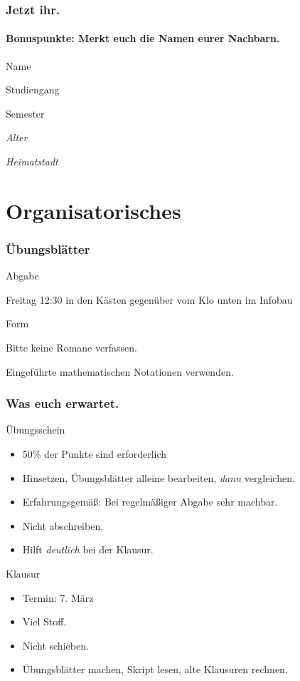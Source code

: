 \documentclass{beamer}
\begin{document}
\begin{frame}
  \frametitle{Jetzt ihr.}
  \framesubtitle{Bonuspunkte: Merkt euch die Namen eurer Nachbarn.}
  \begin{description}
    \item Name
    \item Studiengang
    \item Semester
    \item {\small \textit{Alter}}
    \item {\small \textit{Heimatstadt}}
  \end{description}
\end{frame}

\section{Organisatorisches}
\begin{frame}
  \frametitle{Übungsblätter}
  \begin{block}{Abgabe}
    \begin{description}
      \item{\LARGE Freitag 12:30} in den Kästen gegenüber vom Klo unten im Infobau
    \end{description}
  \end{block}
  \begin{block}{Form}
    \begin{description}
      \item Bitte {\LARGE keine} Romane verfassen.
      \item Eingeführte mathematischen Notationen verwenden.
    \end{description}
  \end{block}
\end{frame}

\begin{frame}
  \frametitle{Was euch erwartet.}
  \begin{block}{Übungsschein}
    \begin{itemize}
      \item 50\% der Punkte sind erforderlich
      \item Hinsetzen, Übungsblätter alleine bearbeiten, \emph{dann} vergleichen.
      \item Erfahrungsgemäß: Bei regelmäßiger Abgabe sehr machbar.
      \item Nicht abschreiben.
      \item Hilft \emph{deutlich} bei der Klausur.
    \end{itemize}
  \end{block}
  \begin{block}{Klausur}
    \begin{itemize}
      \item Termin: 7. März
      \item {\LARGE Viel} Stoff.
      \item {\LARGE Nicht schieben.}
      \item Übungsblätter machen, Skript lesen, alte Klausuren rechnen.
    \end{itemize}
  \end{block}
\end{frame}
\end{document}
